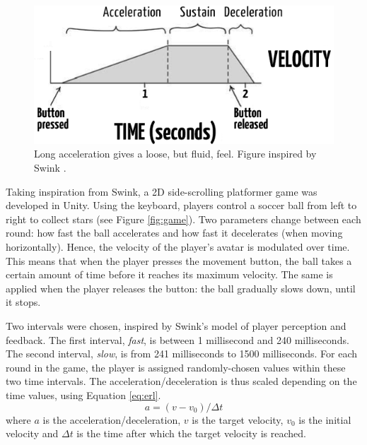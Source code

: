 \begin{figure}[htbp]
\centering
\includegraphics[width=0.6\columnwidth]{Pics/loose2}
\caption{Long acceleration gives a loose, but fluid, feel. Figure inspired by Swink \cite{swink}.}
\label{fig:adsr_loose}
\end{figure}

Taking inspiration from Swink, a 2D side-scrolling platformer game was developed in Unity. Using the keyboard, players control a soccer ball from left to right to collect stars (see Figure \ref{fig:game}). Two parameters change between each round: how fast the ball accelerates and how fast it decelerates (when moving horizontally). Hence, the velocity of the player's avatar is modulated over time. This means that when the player presses the movement button, the ball takes a certain amount of time before it reaches its maximum velocity. The same is applied when the player releases the button: the ball gradually slows down, until it stops.



Two intervals were chosen, inspired by Swink's model of player perception and feedback. The first interval, \textit{fast}, is between 1 millisecond and 240 milliseconds. The second interval, \textit{slow}, is from 241 milliseconds to 1500 milliseconds. For each round in the game, the player is assigned randomly-chosen values within these two time intervals. 
The acceleration/deceleration is thus scaled depending on the time values, using Equation \ref{eq:erl}.
\begin{equation} \label{eq:erl} %
a = (v - v_0)/{\Delta}t
\end{equation} 
where $a$ is the acceleration/deceleration, $v$ is the target velocity, $v_0$ is the initial velocity and ${\Delta}t$ is the time after which the target velocity is reached.

